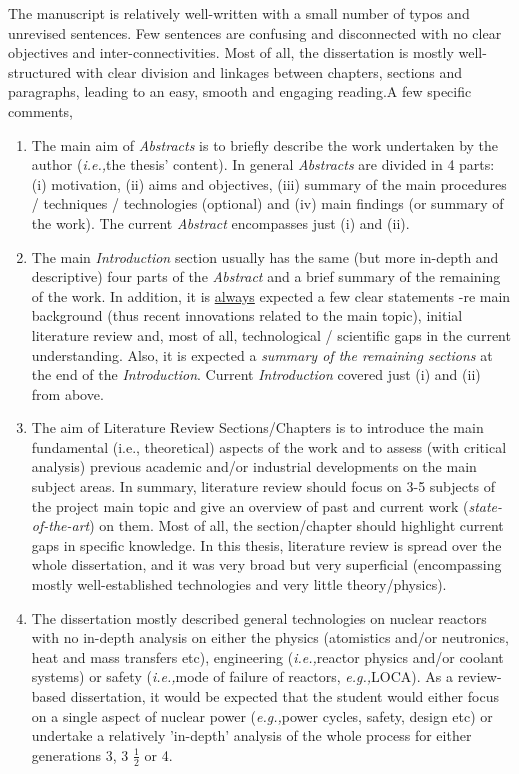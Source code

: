 \documentclass[14pt,twoside]{report}
\newcommand{\ie}{{\it i.e.,}}
\newcommand{\eg}{{\it e.g.,}}
\begin{document}
The manuscript is relatively well-written with a small number of typos and unrevised sentences. Few sentences are confusing and disconnected with no clear objectives and inter-connectivities. Most of all, the dissertation is mostly well-structured with clear division and linkages between chapters, sections and paragraphs, leading to an easy, smooth and engaging reading.A few specific comments,
\begin{enumerate}
%
\item The main aim of {\it Abstracts} is to briefly describe the work undertaken by the author (\ie the thesis' content). In general {\it Abstracts} are divided in 4 parts: (i) motivation, (ii) aims and objectives, (iii) summary of the main procedures / techniques / technologies (optional) and (iv) main findings (or summary of the work). The current {\it Abstract} encompasses just (i) and (ii).
%
\item The main {\it Introduction} section usually has the same (but more in-depth and descriptive) four parts of the {\it Abstract} and a brief summary of the remaining of the work. In addition, it is \underline{always} expected a few clear statements -re main background (thus recent innovations related to the main topic), initial literature review and, most of all, technological / scientific gaps in the current understanding. Also, it is expected a {\it summary of the remaining sections} at the end of the {\it Introduction}.  Current {\it Introduction} covered just (i) and (ii) from above.
%
\item The aim of Literature Review Sections/Chapters is to introduce the main fundamental (i.e., theoretical) aspects of the work and to assess (with critical analysis) previous academic and/or industrial developments on the main subject areas. In summary, literature review should focus on 3-5 subjects of the project main topic and give an overview of past and current work ({\it state-of-the-art}) on them. Most of all, the section/chapter should highlight current gaps in specific knowledge. In this thesis, literature review is spread over the whole dissertation, and it was very broad but very superficial (encompassing mostly well-established technologies and very little theory/physics). 
%
\item The dissertation mostly described general technologies on nuclear reactors with no in-depth analysis on either the physics (atomistics and/or neutronics, heat and mass transfers etc), engineering (\ie reactor physics and/or coolant systems) or safety (\ie mode of failure of reactors, \eg LOCA). As a review-based dissertation, it would be expected that the student would either focus on a single aspect of nuclear power (\eg power cycles, safety, design etc) or undertake a relatively 'in-depth' analysis of the whole process for either generations 3, 3 $\frac{1}{2}$ or 4.

\end{enumerate}
\end{document}
